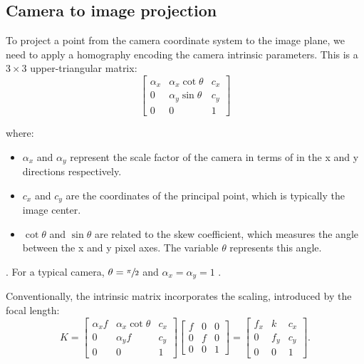 \subsection{Camera to image projection}\label{sub:camera_to_image_projection}

To project a point from the camera coordinate system to the image plane, we
need to apply a homography encoding the camera intrinsic parameters.
This is a \(3 \times 3\) upper-triangular matrix:
\begin{equation}
	\begin{bmatrix}
		\alpha_x & \alpha_x \cot \theta & c_x \\
		0        & \alpha_y \sin \theta & c_y \\
		0        & 0                    & 1
	\end{bmatrix}
\end{equation}

where:
\begin{itemize}
	\item $\alpha_x$ and $\alpha_y$ represent the scale factor of the camera in
	      terms of  in the x and y directions respectively.
	\item $c_x$ and $c_y$ are the coordinates of the principal point, which is typically the image center.
	\item $\cot \theta$ and $\sin \theta$ are related to the skew coefficient, which measures the angle between the x and y pixel axes. The variable $\theta$ represents this angle.
\end{itemize}.
For a typical camera, \(\theta = \sfrac{\pi}{2}\) and \(\alpha_x = \alpha_y = 1
\) .

Conventionally, the intrinsic matrix incorporates the scaling, introduced
by the focal length:
\begin{equation}
	K = \begin{bmatrix}
		\alpha_x f & \alpha_x \cot \theta & c_x \\
		0          & \alpha_y f           & c_y \\
		0          & 0                    & 1
	\end{bmatrix} \begin{bmatrix}
		f & 0 & 0 \\
		0 & f & 0 \\
		0 & 0 & 1
	\end{bmatrix} = \begin{bmatrix}
		f_x & k   & c_x \\
		0   & f_y & c_y \\
		0   & 0   & 1
	\end{bmatrix}.
\end{equation}


